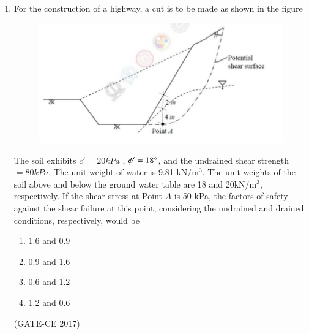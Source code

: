 \documentclass[journal,12pt,onecolumn]{article}
\theoremstyle{remark}
\begin{document}
\begin{enumerate}
    \item For the construction of a highway, a cut is to be made as shown in the figure 
    \begin{figure}[H]
    \centering
    \includegraphics[width=0.7\columnwidth]{q37.jpg}  
    \caption{}
    \label{fig:9}
    \end{figure}
    The soil exhibits $c' = 20 kPa$ , $\phi' = 18\degree $, and the undrained shear strength $ = 80kPa $. The unit weight of water is 9.81 kN/m$^3$. The unit weights of the soil above and below the ground water table are 18 and 20kN/m$^3$, respectively. If the shear stress at Point $ A $ is 50 kPa, the factors of safety against the shear failure at this point, considering the undrained and drained conditions, respectively, would be
    \begin{multicols}{4}
    \begin{enumerate}
        \item 1.6 and 0.9  
        \item 0.9 and 1.6  
        \item 0.6 and 1.2  
        \item 1.2 and 0.6  
    \end{enumerate}
    \end{multicols}
    \hfill (GATE-CE 2017)


\end{enumerate}
\end{document}
